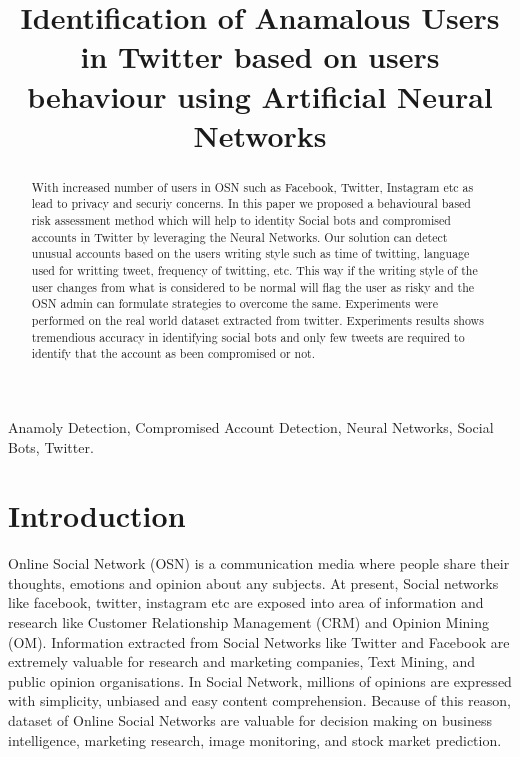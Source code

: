 \documentclass[conference]{IEEEtran}
\begin{document}
\title{Identification of Anamalous Users in Twitter based on users behaviour using Artificial Neural Networks}

\author{

}

\maketitle

\begin{abstract}

With increased number of users in OSN such as Facebook, Twitter, Instagram etc as lead to privacy and securiy concerns.
In this paper we proposed a behavioural based risk assessment method which will help to identity Social bots and compromised accounts in Twitter by leveraging the Neural Networks.
Our solution can detect unusual accounts based on the users writing style such as time of twitting, language used for writting tweet, frequency of twitting, etc. This way if the writing style of the user changes 
from what is considered to be normal will flag the user as risky and the OSN admin can formulate strategies to overcome the same. Experiments were performed 
on the real world dataset extracted from twitter. Experiments results shows tremendious accuracy in identifying social bots and  only few tweets are required to identify that the account as been compromised or not.

\end{abstract}

\begin{IEEEkeywords}

Anamoly Detection, Compromised Account Detection, Neural Networks, Social Bots, Twitter.

\end{IEEEkeywords}

\section{Introduction}

Online Social Network (OSN) is a communication media where people share their thoughts, emotions and opinion about any subjects. At present, Social networks like facebook, twitter, instagram etc are exposed
into area of information and research like Customer Relationship Management (CRM) and Opinion Mining (OM). Information extracted from Social Networks like Twitter and Facebook are extremely valuable for research
and marketing companies, Text Mining, and public opinion organisations.
In Social Network, millions of opinions are expressed with simplicity, unbiased and easy content comprehension. Because of this reason, dataset of Online Social Networks are valuable for decision making on 
business intelligence, marketing research,  image monitoring, and stock market prediction.
\end{document}
